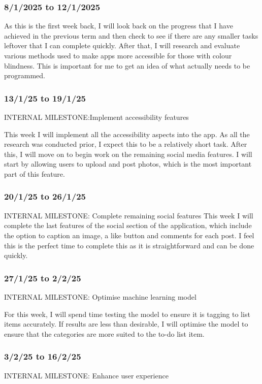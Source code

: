 \documentclass[12pt]{article}
\begin{document}
\subsubsection{8/1/2025 to 12/1/2025}
As this is the first week back, I will look back on the progress that I have achieved in the previous term and then check to see if there are any smaller tasks leftover that I can complete quickly. After that, I will research and evaluate various methods used to make apps more accessible for those with colour blindness. This is important for me to get an idea of what actually needs to be programmed.

\subsubsection{13/1/25 to 19/1/25}
INTERNAL MILESTONE:Implement accessibility features

This week I will implement all the accessibility aspects into the app. As all the research was conducted prior, I expect this to be a relatively short task. After this, I will move on to begin work on the remaining social media features. I will start by allowing users to upload and post photos, which is the most important part of this feature.


\subsubsection{20/1/25 to 26/1/25}
INTERNAL MILESTONE: Complete remaining social features 
This week I will complete the last features of the social section of the application, which include the option to caption an image, a like button and comments for each post. I feel this is the perfect time to complete this as it is straightforward and can be done quickly. 

\subsubsection{27/1/25 to 2/2/25}
INTERNAL MILESTONE: Optimise machine learning model

For this week, I will spend time testing the model to ensure it is tagging to list items accurately. If results are less than desirable, I will optimise the model to ensure that the categories are more suited to the to-do list item. 


\subsubsection{3/2/25 to 16/2/25}
INTERNAL MILESTONE: Enhance user experience
\end{document}
